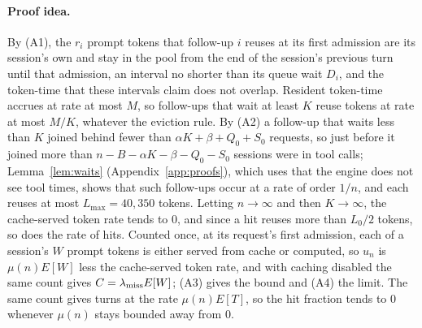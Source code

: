\paragraph{Proof idea.} By (A1), the $r_i$ prompt tokens that follow-up $i$ reuses at its first admission are its session's own and stay in the pool from the end of the session's previous turn until that admission, an interval no shorter than its queue wait $D_i$, and the token-time that these intervals claim does not overlap. Resident token-time accrues at rate at most $M$, so follow-ups that wait at least $K$ reuse tokens at rate at most $M/K$, whatever the eviction rule. By (A2) a follow-up that waits less than $K$ joined behind fewer than $\alpha K+\beta+Q_0+S_0$ requests, so just before it joined more than $n-B-\alpha K-\beta-Q_0-S_0$ sessions were in tool calls; Lemma~\ref{lem:waits} (Appendix~\ref{app:proofs}), which uses that the engine does not see tool times, shows that such follow-ups occur at a rate of order $1/n$, and each reuses at most $L_{\max}=40{,}350$ tokens. Letting $n\to\infty$ and then $K\to\infty$, the cache-served token rate tends to 0, and since a hit reuses more than $L_0/2$ tokens, so does the rate of hits. Counted once, at its request's first admission, each of a session's $W$ prompt tokens is either served from cache or computed, so $u_n$ is $\mu(n)E[W]$ less the cache-served token rate, and with caching disabled the same count gives $C=\lambda_{\mathrm{miss}} E[W]$; (A3) gives the bound and (A4) the limit. The same count gives turns at the rate $\mu(n)E[T]$, so the hit fraction tends to 0 whenever $\mu(n)$ stays bounded away from 0.

